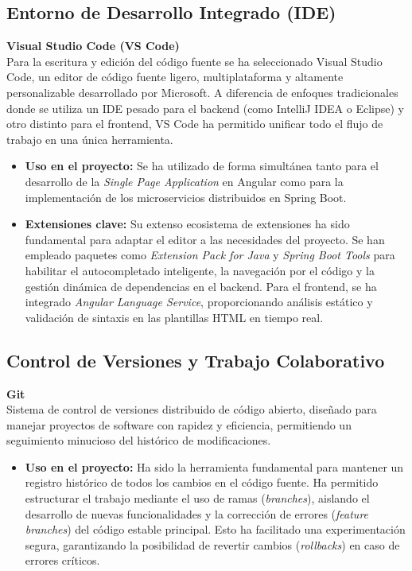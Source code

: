     \subsection{Entorno de Desarrollo Integrado (IDE)}
    
    \textbf{Visual Studio Code (VS Code)} ~\cite{VSCode} \\
    Para la escritura y edición del código fuente se ha seleccionado Visual Studio Code, un editor de código fuente ligero, multiplataforma y altamente personalizable desarrollado por Microsoft. A diferencia de enfoques tradicionales donde se utiliza un IDE pesado para el backend (como IntelliJ IDEA o Eclipse) y otro distinto para el frontend, VS Code ha permitido unificar todo el flujo de trabajo en una única herramienta.
    \begin{itemize}
        \item \textbf{Uso en el proyecto:} Se ha utilizado de forma simultánea tanto para el desarrollo de la \textit{Single Page Application} en Angular como para la implementación de los microservicios distribuidos en Spring Boot.
        \item \textbf{Extensiones clave:} Su extenso ecosistema de extensiones ha sido fundamental para adaptar el editor a las necesidades del proyecto. Se han empleado paquetes como \textit{Extension Pack for Java} y \textit{Spring Boot Tools} para habilitar el autocompletado inteligente, la navegación por el código y la gestión dinámica de dependencias en el backend. Para el frontend, se ha integrado \textit{Angular Language Service}, proporcionando análisis estático y validación de sintaxis en las plantillas HTML en tiempo real.
    \end{itemize}
    
    \subsection{Control de Versiones y Trabajo Colaborativo}
    
    \textbf{Git} ~\cite{Git} \\
    Sistema de control de versiones distribuido de código abierto, diseñado para manejar proyectos de software con rapidez y eficiencia, permitiendo un seguimiento minucioso del histórico de modificaciones.
    \begin{itemize}
        \item \textbf{Uso en el proyecto:} Ha sido la herramienta fundamental para mantener un registro histórico de todos los cambios en el código fuente. Ha permitido estructurar el trabajo mediante el uso de ramas (\textit{branches}), aislando el desarrollo de nuevas funcionalidades y la corrección de errores (\textit{feature branches}) del código estable principal. Esto ha facilitado una experimentación segura, garantizando la posibilidad de revertir cambios (\textit{rollbacks}) en caso de errores críticos.
    \end{itemize}
    
